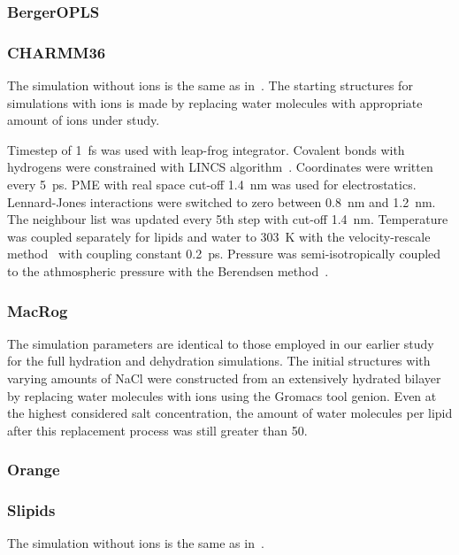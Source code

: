 \documentclass[pre,aps,floatfix,authordate1-4,twocolumn]{revtex4-1}
\begin{document}
\subsubsection{BergerOPLS}

\subsubsection{CHARMM36}
The simulation without ions is the same as in~\cite{botan15}. The starting structures for simulations with ions is
made by replacing water molecules with appropriate amount of ions under study.

Timestep of 1~fs was used with leap-frog integrator. Covalent bonds with hydrogens were constrained with LINCS algorithm~\cite{hess97,hess07}. 
Coordinates were written every 5~ps. PME with real space cut-off 1.4~nm was used 
for electrostatics. Lennard-Jones interactions were switched to zero between 0.8~nm and 1.2~nm.
The neighbour list was updated every 5th step with cut-off 1.4~nm. Temperature was coupled separately
for lipids and water to 303~K with the velocity-rescale method~\cite{bussi07} with coupling constant 0.2~ps.
Pressure was semi-isotropically coupled to the athmospheric pressure with the Berendsen method~\cite{berendsen84}.

\subsubsection{MacRog}
The simulation parameters are identical to those employed in our earlier study~\cite{botan15} for the full 
hydration and dehydration simulations. The initial structures with varying amounts of NaCl were constructed from an 
extensively hydrated bilayer by replacing water molecules with ions using the Gromacs tool genion. Even at the highest 
considered salt concentration, the amount of water molecules per lipid after this replacement process was still greater than 50.

\subsubsection{Orange}

\subsubsection{Slipids}
The simulation without ions is the same as in~\cite{botan15}.
\end{document}
